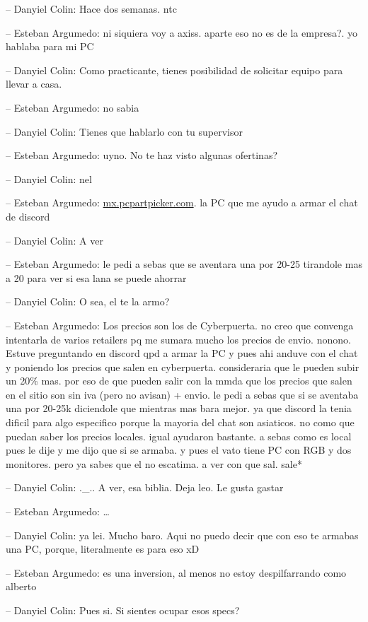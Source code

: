 -- Danyiel Colin: Hace dos semanas. ntc

-- Esteban Argumedo: ni siquiera voy a axiss. aparte eso no es de la
empresa?. yo hablaba para mi PC

-- Danyiel Colin: Como practicante, tienes posibilidad de solicitar
equipo para llevar a casa.

-- Esteban Argumedo: no sabia

-- Danyiel Colin: Tienes que hablarlo con tu supervisor

-- Esteban Argumedo: uyno. No te haz visto algunas ofertinas?

-- Danyiel Colin: nel

-- Esteban Argumedo:
\href{https://mx.pcpartpicker.com/list/b62Bv3}{mx.pcpartpicker.com}. la
PC que me ayudo a armar el chat de discord

-- Danyiel Colin: A ver

-- Esteban Argumedo: le pedi a sebas que se aventara una por 20-25
tirandole mas a 20 para ver si esa lana se puede ahorrar

-- Danyiel Colin: O sea, el te la armo?

-- Esteban Argumedo: Los precios son los de Cyberpuerta. no creo que
convenga intentarla de varios retailers pq me sumara mucho los precios
de envio. nonono. Estuve preguntando en discord qpd a armar la PC y pues
ahi anduve con el chat y poniendo los precios que salen en cyberpuerta.
consideraria que le pueden subir un 20\% mas. por eso de que pueden
salir con la mmda que los precios que salen en el sitio son sin iva
(pero no avisan) + envio. le pedi a sebas que si se aventaba una por
20-25k diciendole que mientras mas bara mejor. ya que discord la tenia
dificil para algo especifico porque la mayoria del chat son asiaticos.
no como que puedan saber los precios locales. igual ayudaron bastante. a
sebas como es local pues le dije y me dijo que si se armaba. y pues el
vato tiene PC con RGB y dos monitores. pero ya sabes que el no escatima.
a ver con que sal. sale*

-- Danyiel Colin: .\_.. A ver, esa biblia. Deja leo. Le gusta gastar

-- Esteban Argumedo: \ldots{}

-- Danyiel Colin: ya lei. Mucho baro. Aqui no puedo decir que con eso te
armabas una PC, porque, literalmente es para eso xD

-- Esteban Argumedo: es una inversion, al menos no estoy despilfarrando
como alberto

-- Danyiel Colin: Pues si. Si sientes ocupar esos specs?

